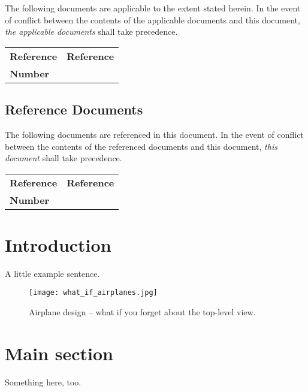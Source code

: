 \documentclass[11pt,a4paper]{article}
\begin{document}
The following documents are applicable to the extent stated herein. In the
event of conflict between the contents of the applicable documents and this
document, \emph{the applicable documents} shall take precedence.

\begin{center}{
\begin{tabularx}{\textwidth}{|l|X|}
    \hline
    \bf{Reference} & \bf{Reference}\\
    \bf{Number} & \\
    \hline
\end{tabularx}}
\end{center}

\subsection*{Reference Documents}

The following documents are referenced in this document. In the event of
conflict between the contents of the referenced documents and this document,
\emph{this document} shall take precedence.

\begin{center}{
\begin{tabularx}{\textwidth}{|l|X|}
    \hline
    \bf{Reference} & \bf{Reference}\\
    \bf{Number} & \\
    \hline
\end{tabularx}}
\end{center}




\newpage
\section{Introduction}


A little example sentence.

\begin{figure}
\centering
\texttt{[image: what\_if\_airplanes.jpg]}
\caption{Airplane design -- what if you forget about the top-level view.}
\label{fig:airplanes}
\end{figure}

\section{Main section}
\label{section:main}

Something here, too.
\end{document}

